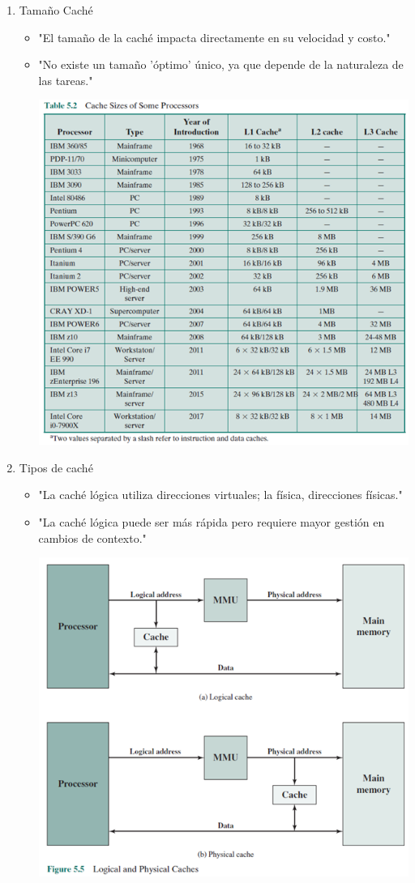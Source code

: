 \documentclass[presentation]{beamer}
\begin{document}
\begin{enumerate}
\item Tamaño Caché
\label{sec:org7a88896}
\begin{itemize}
\item "El tamaño de la caché impacta directamente en su velocidad y costo."
\item "No existe un tamaño 'óptimo' único, ya que depende de la naturaleza de las tareas."
\begin{center}
\includegraphics[width=.9\linewidth]{./Imagenes/tabla5.2.png}
\end{center}
\end{itemize}

\item Tipos de caché
\label{sec:orgd9bb906}
\begin{itemize}
\item "La caché lógica utiliza direcciones virtuales; la física, direcciones físicas."
\item "La caché lógica puede ser más rápida pero requiere mayor gestión en cambios de contexto."
\begin{center}
\includegraphics[width=.9\linewidth]{./Imagenes/fig5.png}
\end{center}
\end{itemize}
\end{enumerate}
\end{document}
